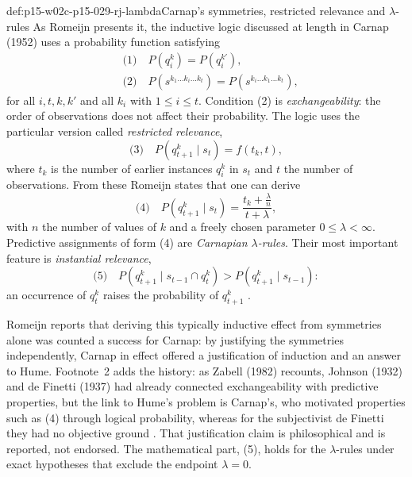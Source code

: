 \begin{hbdefinition}{def:p15-w02c-p15-029-rj-lambda}{Carnap's symmetries, restricted relevance and \texorpdfstring{\(\lambda\)}{lambda}-rules}
As Romeijn presents it, the inductive logic discussed at length in
Carnap (1952) uses a probability function satisfying
\begin{align*}
 &\text{(1)}\quad P(q^k_i)=P(q^{k'}_i),\\
 &\text{(2)}\quad P(s^{k_1\ldots k_i\ldots k_t})=P(s^{k_i\ldots k_1\ldots k_t}),
\end{align*}
for all \(i,t,k,k'\) and all \(k_i\) with \(1\le i\le t\). Condition (2)
is \emph{exchangeability}: the order of observations does not affect
their probability. The logic uses the particular version called
\emph{restricted relevance},
\[
 \text{(3)}\quad P(q^k_{t+1}\mid s_t)=f(t_k,t),
\]
where \(t_k\) is the number of earlier instances \(q^k_i\) in \(s_t\) and
\(t\) the number of observations. From these Romeijn states that one
can derive
\[
 \text{(4)}\quad P(q^k_{t+1}\mid s_t)=\frac{t_k+\frac{\lambda}{n}}{t+\lambda},
\]
with \(n\) the number of values of \(k\) and a freely chosen parameter
\(0\le\lambda<\infty\). Predictive assignments of form (4) are
\emph{Carnapian \(\lambda\)-rules}. Their most important feature is
\emph{instantial relevance},
\[
 \text{(5)}\quad P(q^k_{t+1}\mid s_{t-1}\cap q^k_t)>P(q^k_{t+1}\mid s_{t-1}):
\]
an occurrence of \(q^k_t\) raises the probability of \(q^k_{t+1}\)
\cite[p.~631]{Romeijn2011InductiveLogicStatistics}.
\end{hbdefinition}

Romeijn reports that deriving this typically inductive effect from
symmetries alone was counted a success for Carnap: by justifying the
symmetries independently, Carnap in effect offered a justification of
induction and an answer to Hume. Footnote~2 adds the history: as
Zabell (1982) recounts, Johnson (1932) and de Finetti (1937) had
already connected exchangeability with predictive properties, but the
link to Hume's problem is Carnap's, who motivated properties such as
(4) through logical probability, whereas for the subjectivist de Finetti
they had no objective ground \cite[p.~631 and n.~2]{Romeijn2011InductiveLogicStatistics}.
That justification claim is philosophical and is reported, not
endorsed. The mathematical part, (5), holds for the \(\lambda\)-rules
under exact hypotheses that exclude the endpoint \(\lambda=0\).

